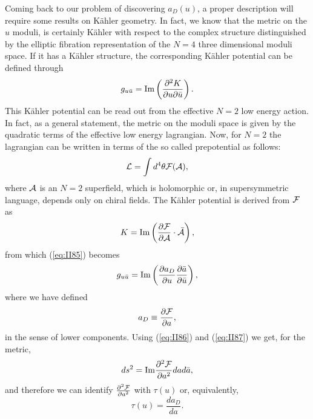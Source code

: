 Coming back to our problem of discovering $a_D(u)$, a proper
description will require some results on K\"{a}hler geometry. In
fact, we know that the metric on the $u$ moduli, is certainly
K\"{a}hler with respect to the complex structure distinguished by
the elliptic fibration representation of the $N\!=\!4$ three
dimensional moduli space. If it has a K\"{a}hler structure, the
corresponding K\"{a}hler potential can be defined through
\begin{equation}
g_{u\bar{u}} = \hbox {Im} \left( \frac {\partial^2 K}{\partial u
\partial \bar{u}} \right).
\label{eq:II85}
\end{equation}
This K\"{a}hler potential can be read out from the effective
$N\!=\!2$ low energy action. In fact, as a general statement, the
metric on the moduli space is given by the quadratic terms of the
effective low energy lagrangian. Now, for $N\!=\!2$ the
lagrangian can be written in terms of the so called
prepotential as follows:
\begin{equation}
{\cal L} = \int d^4 \theta {\cal F}({\cal A}),
\label{eq:II86}
\end{equation}
where ${\cal A}$ is an $N\!=\!2$ superfield, which is holomorphic
or, in supersymmetric language, depends only on chiral
fields. The K\"{a}hler potential is derived from ${\cal
F}$ as
\begin{equation}
K = \hbox {Im} \left( \frac {\partial {\cal F}}{\partial {\cal
A}} \cdot \bar{\cal A} \right),
\label{eq:II87}
\end{equation}
from which (\ref{eq:II85}) becomes
\begin{equation}
g_{u\bar{u}} = \hbox {Im} \left( \frac {\partial a_D}{\partial u}
\frac {\partial \bar{a}}{\partial \bar{u}} \right),
\label{eq:II88}
\end{equation}
where we have defined
\begin{equation}
a_D \equiv \frac {\partial {\cal F}}{\partial a},
\label{eq:II89}
\end{equation}
in the sense of lower components. Using (\ref{eq:II86}) and
(\ref{eq:II87}) we get, for the metric,
\begin{equation}
d s^2 = \hbox {Im} \frac {\partial^2 {\cal F}}{\partial a^2} da
d\bar{a},
\label{eq:II90}
\end{equation}
and therefore we can identify $\frac {\partial^2 {\cal
F}}{\partial a^2}$ with $\tau(u)$ or, equivalently, 
\begin{equation}
\tau(u) = \frac {da_D}{da}.
\label{eq:II91}
\end{equation}
